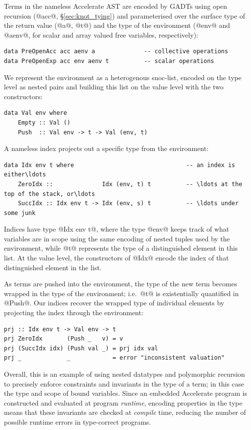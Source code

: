 Terms in the nameless Accelerate AST are encoded by GADTs using open recursion
(@acc@, \S\ref{sec:knot_tying}) and parameterised over the surface type of the
return value (@a@, @t@) and the type of the environment (@env@ and @aenv@, for
scalar and array valued free variables, respectively):
%
\begin{lstlisting}[style=haskell]
data PreOpenAcc acc aenv a              -- collective operations
data PreOpenExp acc env aenv t          -- scalar operations
\end{lstlisting}

We represent the environment as a heterogenous snoc-list, encoded on the type
level as nested pairs and building this list on the value level with the two
constructors:
%
\begin{lstlisting}[style=haskell]
data Val env where
    Empty :: Val ()
    Push  :: Val env -> t -> Val (env, t)
\end{lstlisting}
%
A nameless  index projects out a specific type from the
environment:
%
\begin{lstlisting}[style=haskell]
data Idx env t where                                -- an index is either\ldots
    ZeroIdx ::              Idx (env, t) t          -- \ldots at the top of the stack, or\ldots
    SuccIdx :: Idx env t -> Idx (env, s) t          -- \ldots under some junk
\end{lstlisting}
%
Indices have type @Idx env t@, where the type @env@ keeps track of what
variables are in scope using the same encoding of nested tuples used by the
environment, while @t@ represents the type of a distinguished element in this
list. At the value level, the constructors of @Idx@ encode the index of that
distinguished element in the list.

As terms are pushed into the environment, the type of the new term becomes
wrapped in the type of the environment; i.e.\ @t@ is existentially quantified in
@Push@. Our  indices recover the wrapped type of individual
elements by projecting the index through the environment:
%
\begin{lstlisting}[style=haskell]
prj :: Idx env t -> Val env -> t
prj ZeroIdx       (Push _   v) = v
prj (SuccIdx idx) (Push val _) = prj idx val
prj _             _            = error "inconsistent valuation"
\end{lstlisting}

Overall, this is an example of using nested datatypes and polymorphic recursion
to precisely enforce constraints and invariants in the type of a term; in this
case the type and scope of bound variables. Since an embedded Accelerate program is
constructed and evaluated at program \emph{runtime}, encoding properties in the
type means that these invariants are checked at \emph{compile} time, reducing
the number of possible runtime errors in type-correct programs.


